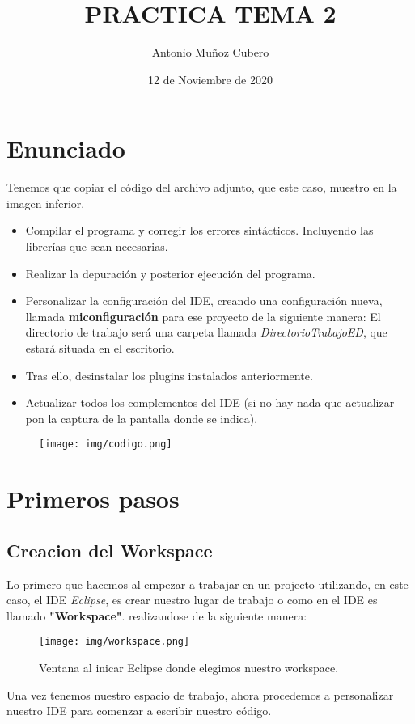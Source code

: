 \documentclass{article}
\title{PRACTICA TEMA 2}
\author{Antonio Muñoz Cubero}
\date{12 de Noviembre de 2020}
\begin{document}
  \maketitle
      \pagestyle{fancy}
  
  \newpage
    \tableofcontents

  \newpage
    \section{Enunciado}
    
    Tenemos que copiar  el  código del archivo adjunto, que este caso, muestro en la imagen inferior.
    \begin{itemize}      
      \item Compilar el programa y corregir los errores sintácticos. Incluyendo las librerías que sean necesarias.
      \item Realizar la depuración y posterior ejecución del programa.
      \item Personalizar la configuración del IDE, creando una configuración nueva, llamada \textbf{miconfiguración} para ese proyecto de la siguiente manera: 
      El directorio de trabajo será una carpeta llamada \textit{DirectorioTrabajoED}, que estará situada en el escritorio.
      \item Tras ello, desinstalar los plugins instalados anteriormente.
      \item Actualizar todos los complementos del IDE (si no hay nada que actualizar pon la captura de la pantalla donde se indica).
    \end{itemize}

    \begin{figure}[h]
      \centering
      \texttt{[image: img/codigo.png]}
    \end{figure}
  \newpage
    \section{Primeros pasos}
      \subsection{Creacion del Workspace}
        Lo primero que hacemos al empezar a trabajar en un projecto utilizando, en este caso, el IDE \textit{Eclipse}, es crear nuestro lugar de trabajo o como en el IDE es llamado
        \textbf{"Workspace"}. realizandose de la siguiente manera:
        \begin{figure}[h]
          \centering
          \texttt{[image: img/workspace.png]}
          \caption{Ventana al inicar Eclipse donde elegimos nuestro workspace.}
        \end{figure}
        Una vez tenemos nuestro espacio de trabajo, ahora procedemos a personalizar nuestro IDE para comenzar a escribir nuestro código.
  \newpage      
\end{document}
